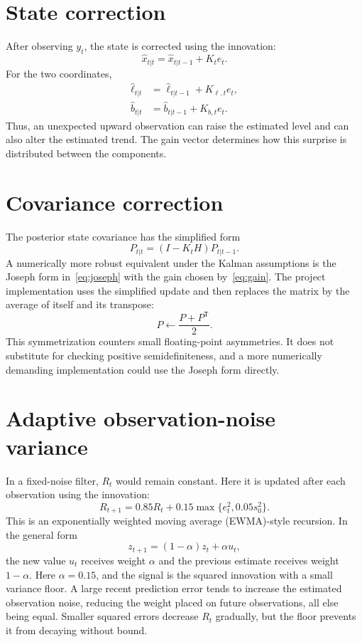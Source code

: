 \documentclass[12pt,a4paper,oneside]{report}
\numberwithin{equation}{chapter}
\numberwithin{figure}{chapter}
\numberwithin{table}{chapter}
\theoremstyle{definition}
\theoremstyle{plain}
\newcommand{\1}{\mathbf{1}}
\newcommand{\trans}{^{\mathsf T}}
\newcommand{\hatt}[1]{\widehat{#1}}
\begin{document}
\section{State correction}
After observing $y_t$, the state is corrected using the innovation:
\begin{equation}
  \hatt{x}_{t|t}=\hatt{x}_{t|t-1}+K_te_t.
  \label{eq:update}
\end{equation}
For the two coordinates,
\begin{align}
  \hatt{\ell}_{t|t}&=\hatt{\ell}_{t|t-1}+K_{\ell,t}e_t,\\
  \hatt{b}_{t|t}&=\hatt{b}_{t|t-1}+K_{b,t}e_t.
\end{align}
Thus, an unexpected upward observation can raise the estimated level and can also alter the estimated trend. The gain vector determines how this surprise is distributed between the components.

\section{Covariance correction}
The posterior state covariance has the simplified form
\begin{equation}
  P_{t|t}=(I-K_tH)P_{t|t-1}.
  \label{eq:covupdate}
\end{equation}
A numerically more robust equivalent under the Kalman assumptions is the Joseph form in~\eqref{eq:joseph} with the gain chosen by~\eqref{eq:gain}. The project implementation uses the simplified update and then replaces the matrix by the average of itself and its transpose:
\[
  P\leftarrow\frac{P+P\trans}{2}.
\]
This symmetrization counters small floating-point asymmetries. It does not substitute for checking positive semidefiniteness, and a more numerically demanding implementation could use the Joseph form directly.

\section{Adaptive observation-noise variance}
In a fixed-noise filter, $R_t$ would remain constant. Here it is updated after each observation using the innovation:
\begin{equation}
  R_{t+1}=0.85R_t+0.15\max\{e_t^2,0.05s_0^2\}.
  \label{eq:adaptiveR}
\end{equation}
This is an exponentially weighted moving average (EWMA)-style recursion. In the general form
\[
  z_{t+1}=(1-\alpha)z_t+\alpha u_t,
\]
the new value $u_t$ receives weight $\alpha$ and the previous estimate receives weight $1-\alpha$. Here $\alpha=0.15$, and the signal is the squared innovation with a small variance floor. A large recent prediction error tends to increase the estimated observation noise, reducing the weight placed on future observations, all else being equal. Smaller squared errors decrease $R_t$ gradually, but the floor prevents it from decaying without bound.
\end{document}
